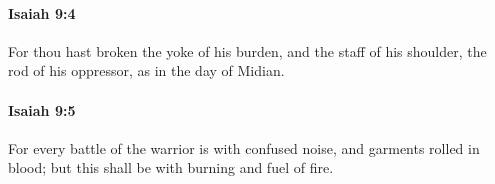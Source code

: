 		\paragraph{Isaiah 9:4} %
			\label{ISAIAH-9-4}

			For thou hast broken the yoke of his burden, and the staff of his shoulder, the rod of his oppressor, as in the day of Midian.


		\paragraph{Isaiah 9:5} %
			\label{ISAIAH-9-5}

			For every battle of the warrior is with confused noise, and garments rolled in blood; but this shall be with burning and fuel of fire.


